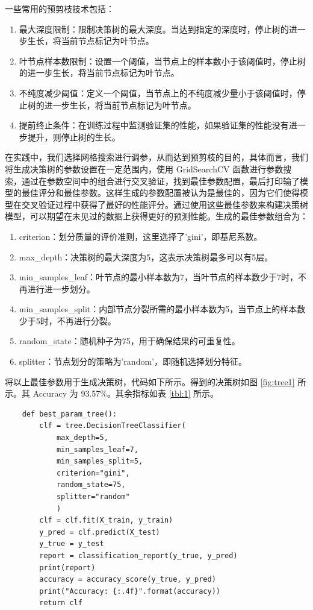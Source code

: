 \documentclass[a4paper,12pt,onecolumn,oneside]{article}
\begin{document}
	一些常用的预剪枝技术包括：
	\begin{enumerate}
		\item 最大深度限制：限制决策树的最大深度。当达到指定的深度时，停止树的进一步生长，将当前节点标记为叶节点。
		\item 叶节点样本数限制：设置一个阈值，当节点上的样本数小于该阈值时，停止树的进一步生长，将当前节点标记为叶节点。
		\item 不纯度减少阈值：定义一个阈值，当节点上的不纯度减少量小于该阈值时，停止树的进一步生长，将当前节点标记为叶节点。
		\item 提前终止条件：在训练过程中监测验证集的性能，如果验证集的性能没有进一步提升，则停止树的生长。
	\end{enumerate}
	在实践中，我们选择网格搜索进行调参，从而达到预剪枝的目的，具体而言，我们将生成决策树的参数设置在一定范围内，使用 GridSearchCV 函数进行参数搜索，通过在参数空间中的组合进行交叉验证，找到最佳参数配置，最后打印输了模型的最佳评分和最佳参数。这样生成的参数配置被认为是最佳的，因为它们使得模型在交叉验证过程中获得了最好的性能评分。通过使用这些最佳参数来构建决策树模型，可以期望在未见过的数据上获得更好的预测性能。生成的最佳参数组合为：
	\begin{enumerate}
		\item criterion：划分质量的评价准则，这里选择了'gini'，即基尼系数。
		\item max\_depth：决策树的最大深度为5，这表示决策树最多可以有5层。
		\item min\_samples\_leaf：叶节点的最小样本数为7，当叶节点的样本数少于7时，不再进行进一步划分。
		\item min\_samples\_split：内部节点分裂所需的最小样本数为5，当节点上的样本数少于5时，不再进行分裂。
		\item random\_state：随机种子为75，用于确保结果的可重复性。
		\item splitter：节点划分的策略为'random'，即随机选择划分特征。
	\end{enumerate}
	将以上最佳参数用于生成决策树，代码如下所示。得到的决策树如图 \ref{fig:tree1} 所示。其 Accuracy 为 93.57\%。其余指标如表 \ref{tbl:1} 所示。
	\lstset{language=Python}
	\lstset{frame=lines}
	\lstset{basicstyle=\footnotesize}
	\begin{lstlisting}
	def best_param_tree():
		clf = tree.DecisionTreeClassifier(
			max_depth=5, 
			min_samples_leaf=7, 
			min_samples_split=5,
			criterion="gini", 
			random_state=75, 
			splitter="random"
			)
		clf = clf.fit(X_train, y_train)
		y_pred = clf.predict(X_test)
		y_true = y_test
		report = classification_report(y_true, y_pred)
		print(report)
		accuracy = accuracy_score(y_true, y_pred)
		print("Accuracy: {:.4f}".format(accuracy))
		return clf
	\end{lstlisting}
\end{document}

